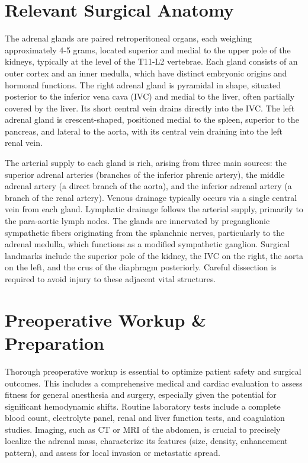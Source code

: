\section*{Relevant Surgical Anatomy}
The adrenal glands are paired retroperitoneal organs, each weighing approximately 4-5 grams, located superior and medial to the upper pole of the kidneys, typically at the level of the T11-L2 vertebrae. Each gland consists of an outer cortex and an inner medulla, which have distinct embryonic origins and hormonal functions. The right adrenal gland is pyramidal in shape, situated posterior to the inferior vena cava (IVC) and medial to the liver, often partially covered by the liver. Its short central vein drains directly into the IVC. The left adrenal gland is crescent-shaped, positioned medial to the spleen, superior to the pancreas, and lateral to the aorta, with its central vein draining into the left renal vein.

The arterial supply to each gland is rich, arising from three main sources: the superior adrenal arteries (branches of the inferior phrenic artery), the middle adrenal artery (a direct branch of the aorta), and the inferior adrenal artery (a branch of the renal artery). Venous drainage typically occurs via a single central vein from each gland. Lymphatic drainage follows the arterial supply, primarily to the para-aortic lymph nodes. The glands are innervated by preganglionic sympathetic fibers originating from the splanchnic nerves, particularly to the adrenal medulla, which functions as a modified sympathetic ganglion. Surgical landmarks include the superior pole of the kidney, the IVC on the right, the aorta on the left, and the crus of the diaphragm posteriorly. Careful dissection is required to avoid injury to these adjacent vital structures.

\section*{Preoperative Workup \& Preparation}
Thorough preoperative workup is essential to optimize patient safety and surgical outcomes. This includes a comprehensive medical and cardiac evaluation to assess fitness for general anesthesia and surgery, especially given the potential for significant hemodynamic shifts. Routine laboratory tests include a complete blood count, electrolyte panel, renal and liver function tests, and coagulation studies. Imaging, such as CT or MRI of the abdomen, is crucial to precisely localize the adrenal mass, characterize its features (size, density, enhancement pattern), and assess for local invasion or metastatic spread.

